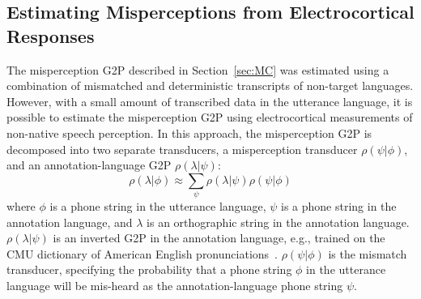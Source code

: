 \subsection{Estimating Misperceptions from Electrocortical Responses}
\label{sec:eegchanmod}

The misperception G2P described in Section~\ref{sec:MC} was estimated
using a combination of mismatched and deterministic transcripts of
non-target languages. However, with a small amount
of transcribed data in the utterance language, it is possible
to estimate the misperception G2P using electrocortical measurements
of non-native speech perception. In this approach, the misperception G2P
is decomposed into two separate transducers,
a misperception transducer $\rho(\psi|\phi)$, and an
annotation-language G2P $\rho(\lambda|\psi)$:
\begin{equation}
  \rho(\lambda|\phi)\approx\sum_{\psi}\rho(\lambda|\psi)\rho(\psi|\phi)
\end{equation}
where $\phi$ is a phone string in the utterance language, $\psi$ is a
phone string in the annotation language, and $\lambda$ is an
orthographic string in the annotation language.  $\rho(\lambda|\psi)$
is an inverted G2P in the annotation language, e.g., trained on the
CMU dictionary of American English pronunciations~\cite{Lenzo1995}.
$\rho(\psi|\phi)$ is the mismatch transducer, specifying the
probability that a phone string $\phi$ in the utterance language will
be mis-heard as the annotation-language phone string $\psi$. 

